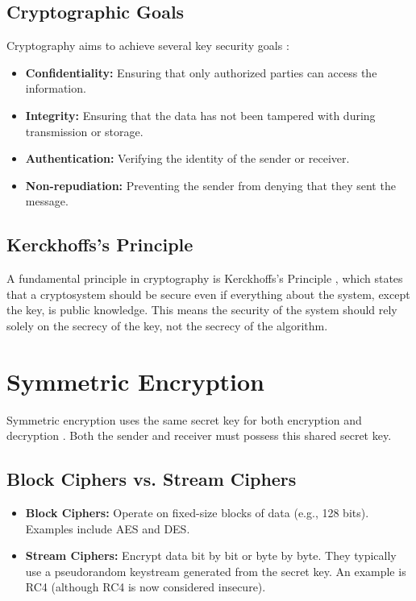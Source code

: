 \documentclass{report}
\begin{document}
\subsection{Cryptographic Goals}
\label{subsec:crypto-goals}

Cryptography aims to achieve several key security goals \cite{stallings}:

\begin{itemize}
    \item \textbf{Confidentiality:} Ensuring that only authorized parties can access the information.
    \item \textbf{Integrity:} Ensuring that the data has not been tampered with during transmission or storage.
    \item \textbf{Authentication:} Verifying the identity of the sender or receiver.
    \item \textbf{Non-repudiation:} Preventing the sender from denying that they sent the message.
\end{itemize}

\subsection{Kerckhoffs's Principle}
\label{subsec:kerckhoffs}

A fundamental principle in cryptography is Kerckhoffs's Principle \cite{kerckhoffs}, which states that a cryptosystem should be secure even if everything about the system, except the key, is public knowledge.  This means the security of the system should rely solely on the secrecy of the key, not the secrecy of the algorithm.

\section{Symmetric Encryption}
\label{sec:symmetric-encryption}

Symmetric encryption uses the same secret key for both encryption and decryption \cite{menezes}. Both the sender and receiver must possess this shared secret key.

\subsection{Block Ciphers vs. Stream Ciphers}
\label{subsec:block-vs-stream}

\begin{itemize}
    \item \textbf{Block Ciphers:} Operate on fixed-size blocks of data (e.g., 128 bits).  Examples include AES and DES.
    \item \textbf{Stream Ciphers:} Encrypt data bit by bit or byte by byte.  They typically use a pseudorandom keystream generated from the secret key.  An example is RC4 (although RC4 is now considered insecure).
\end{itemize}
\end{document}
